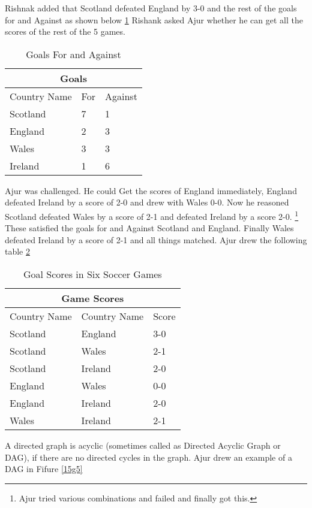 Rishnak added that Scotland defeated England by 3-0 and the rest of the goals for and Against as
shown below \ref{14t2} Rishank asked Ajur whether he can get all the scores of the rest of the 5 games.
\begin{table}
\begin{center}
\begin{tabular}{ |p{3cm}||p{1.5cm}||p{1.5cm} || }
 \hline
 \multicolumn{3}{|c|}{Goals} \\
 \hline
 Country Name & For&Against\\
 \hline
 Scotland  & 7    &1\\
 England& 2&3\\
 Wales&3&3\\
 Ireland&1&6\\
 
 \hline
\end{tabular}
\caption{Goals For and Against}\label{14t2}
\end{center}
\end{table}

Ajur was challenged. He could Get the scores of England immediately, England defeated Ireland by a score of 2-0 and drew with Wales 0-0. Now he reasoned Scotland defeated Wales by a score of 2-1 and defeated Ireland by a score 2-0. \footnote{Ajur tried various combinations and failed and finally got this.} These
satisfied the goals for and Against Scotland and England. Finally Wales defeated Ireland by a score of 2-1
and all things matched.
Ajur drew the following table \ref{14t3}

\begin{table}
\begin{center}
\begin{tabular}{ |p{3cm}||p{3cm}||p{1.5cm} || }
 \hline
 \multicolumn{3}{|c|}{Game Scores} \\
 \hline
 Country Name & Country Name &Score\\
 \hline
 Scotland  & England    &3-0\\
 Scotland& Wales&2-1\\
 Scotland&Ireland&2-0\\
 England&Wales&0-0\\
 England&Ireland &2-0\\
 Wales&Ireland&2-1\\
 
 
 \hline
\end{tabular}
\caption{Goal Scores in Six Soccer Games}\label{14t3}
\end{center}
\end{table}
A directed graph is acyclic (sometimes called as Directed Acyclic Graph or DAG), if there are no directed cycles in the graph. Ajur drew an example of a DAG in Fifure \ref{15g5}

